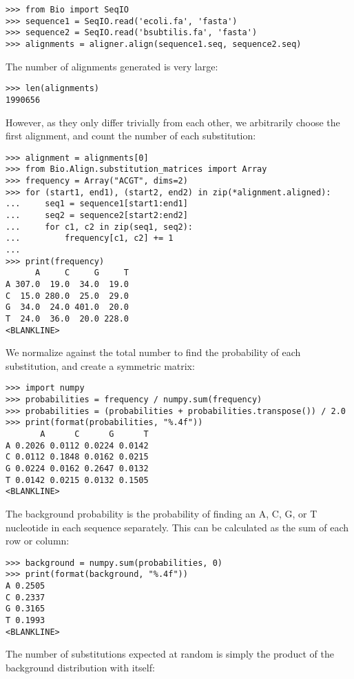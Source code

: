 \begin{verbatim}
>>> from Bio import SeqIO
>>> sequence1 = SeqIO.read('ecoli.fa', 'fasta')
>>> sequence2 = SeqIO.read('bsubtilis.fa', 'fasta')
>>> alignments = aligner.align(sequence1.seq, sequence2.seq)
\end{verbatim}
The number of alignments generated is very large:

\begin{verbatim}
>>> len(alignments)
1990656
\end{verbatim}
However, as they only differ trivially from each other, we arbitrarily choose the first alignment, and count the number of each substitution:

\begin{verbatim}
>>> alignment = alignments[0]
>>> from Bio.Align.substitution_matrices import Array
>>> frequency = Array("ACGT", dims=2)
>>> for (start1, end1), (start2, end2) in zip(*alignment.aligned):
...     seq1 = sequence1[start1:end1]
...     seq2 = sequence2[start2:end2]
...     for c1, c2 in zip(seq1, seq2):
...         frequency[c1, c2] += 1
...
>>> print(frequency)
      A     C     G     T
A 307.0  19.0  34.0  19.0
C  15.0 280.0  25.0  29.0
G  34.0  24.0 401.0  20.0
T  24.0  36.0  20.0 228.0
<BLANKLINE>
\end{verbatim}
We normalize against the total number to find the probability of each substitution, and create a symmetric matrix:

\begin{verbatim}
>>> import numpy
>>> probabilities = frequency / numpy.sum(frequency)
>>> probabilities = (probabilities + probabilities.transpose()) / 2.0
>>> print(format(probabilities, "%.4f"))
       A      C      G      T
A 0.2026 0.0112 0.0224 0.0142
C 0.0112 0.1848 0.0162 0.0215
G 0.0224 0.0162 0.2647 0.0132
T 0.0142 0.0215 0.0132 0.1505
<BLANKLINE>
\end{verbatim}
The background probability is the probability of finding an A, C, G, or T nucleotide in each sequence separately. This can be calculated as the sum of each row or column:

\begin{verbatim}
>>> background = numpy.sum(probabilities, 0)
>>> print(format(background, "%.4f"))
A 0.2505
C 0.2337
G 0.3165
T 0.1993
<BLANKLINE>
\end{verbatim}
The number of substitutions expected at random is simply the product of the background distribution with itself:


